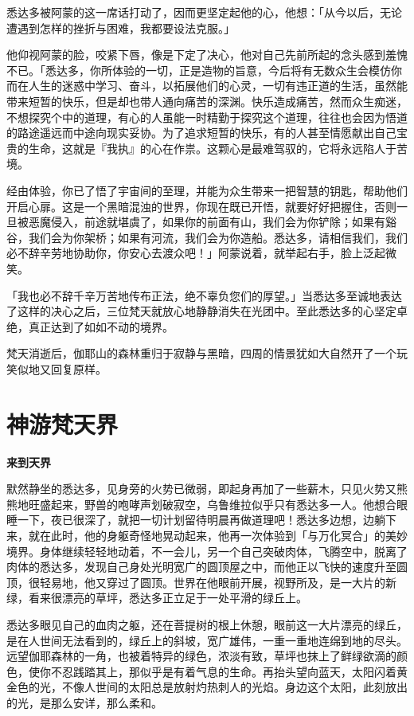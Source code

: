 \documentclass[twoside,openany]{book}
\newcommand{\mt}[1]{\textbullet \textbf{#1}}
\begin{document}
悉达多被阿蒙的这一席话打动了，因而更坚定起他的心，他想：「从今以后，无论遭遇到怎样的挫折与困难，我都要设法克服。」

他仰视阿蒙的脸，咬紧下唇，像是下定了决心，他对自己先前所起的念头感到羞愧不已。「悉达多，你所体验的一切，正是造物的旨意，今后将有无数众生会模仿你而在人生的迷惑中学习、奋斗，以拓展他们的心灵，一切有违正道的生活，虽然能带来短暂的快乐，但是却也带人通向痛苦的深渊。快乐造成痛苦，然而众生痴迷，不想探究个中的道理，有心的人虽能一时精勤于探究这个道理，往往也会因为悟道的路途遥远而中途向现实妥协。为了追求短暂的快乐，有的人甚至情愿献出自己宝贵的生命，这就是『我执』的心在作祟。这颗心是最难驾驭的，它将永远陷人于苦境。

经由体验，你已了悟了宇宙间的至理，并能为众生带来一把智慧的钥匙，帮助他们开启心扉。这是一个黑暗混浊的世界，你现在既已开悟，就要好好把握住，否则一旦被恶魔侵入，前途就堪虞了，如果你的前面有山，我们会为你铲除；如果有谿谷，我们会为你架桥；如果有河流，我们会为你造船。悉达多，请相信我们，我们必不辞辛劳地协助你，你安心去渡众吧！」阿蒙说着，就举起右手，脸上泛起微笑。

「我也必不辞千辛万苦地传布正法，绝不辜负您们的厚望。」当悉达多至诚地表达了这样的决心之后，三位梵天就放心地静静消失在光团中。至此悉达多的心坚定卓绝，真正达到了如如不动的境界。

梵天消逝后，伽耶山的森林重归于寂静与黑暗，四周的情景犹如大自然开了一个玩笑似地又回复原样。

\section{神游梵天界}\label{sec1.18}

\mt{来到天界}

默然静坐的悉达多，见身旁的火势已微弱，即起身再加了一些薪木，只见火势又熊熊地旺盛起来，野兽的咆哮声划破寂空，乌鲁维拉似乎只有悉达多一人。他想合眼睡一下，夜已很深了，就把一切计划留待明晨再做道理吧！悉达多边想，边躺下来，就在此时，他的身躯奇怪地晃动起来，他再一次体验到「与万化冥合」的美妙境界。身体继续轻轻地动着，不一会儿，另一个自己突破肉体，飞腾空中，脱离了肉体的悉达多，发现自己身处光明宽广的圆顶屋之中，而他正以飞快的速度升至圆顶，很轻易地，他又穿过了圆顶。世界在他眼前开展，视野所及，是一大片的新绿，看来很漂亮的草坪，悉达多正立足于一处平滑的绿丘上。

悉达多眼见自己的血肉之躯，还在菩提树的根上休憩，眼前这一大片漂亮的绿丘，是在人世间无法看到的，绿丘上的斜坡，宽广雄伟，一重一重地连绵到地的尽头。远望伽耶森林的一角，也被着特异的绿色，浓淡有致，草坪也抹上了鲜绿欲滴的颜色，使你不忍践踏其上，那似乎是有着气息的生命。再抬头望向蓝天，太阳闪着黄金色的光，不像人世间的太阳总是放射灼热刺人的光焰。身边这个太阳，此刻放出的光，是那么安详，那么柔和。
\end{document}
